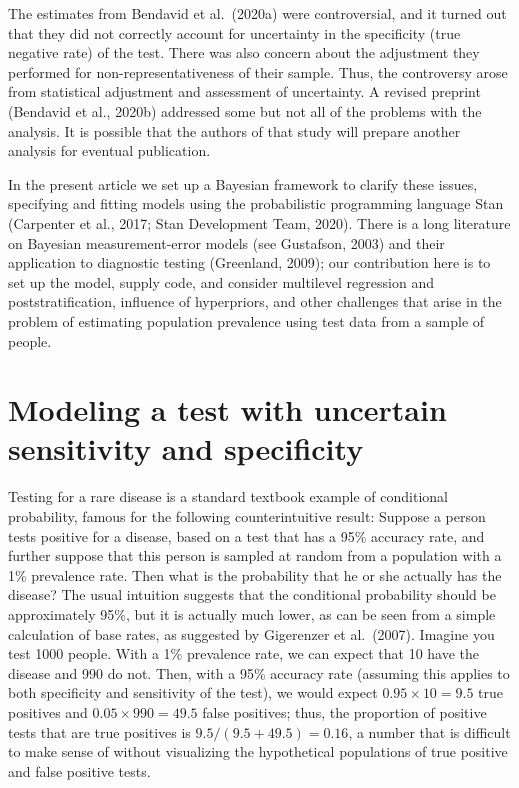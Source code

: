 \documentclass[11pt]{article}
\begin{document}
The estimates from Bendavid et al.\ (2020a) were controversial, and it turned out that they did not correctly account for uncertainty in the specificity (true negative rate) of the test.  There was also concern about the adjustment they performed for non-representativeness of their sample.  Thus, the controversy arose from statistical adjustment and assessment of uncertainty.  A revised preprint (Bendavid et al., 2020b) addressed some but not all of the problems with the analysis.  It is possible that the authors of that study will prepare another analysis for eventual publication.

In the present article we set up a Bayesian framework to clarify these issues, specifying and fitting models using the probabilistic programming language Stan (Carpenter et al., 2017; Stan Development Team, 2020).  There is a long literature on Bayesian measurement-error models (see Gustafson, 2003) and their application to diagnostic testing (Greenland, 2009); our contribution here is to set up the model, supply code, and consider multilevel regression and poststratification, influence of hyperpriors, and other challenges that arise in the problem of estimating population prevalence using test data from a sample of people.


\section{Modeling a test with uncertain sensitivity and specificity}\label{model1}

Testing for a rare disease is a standard textbook example of conditional probability, famous for the following counterintuitive result:  Suppose a person tests positive for a disease, based on a test that has a 95\% accuracy rate, and further suppose that this person is sampled at random from a population with a 1\% prevalence rate.  Then what is the probability that he or she actually has the disease? The usual intuition suggests that the conditional probability should be approximately 95\%, but it is actually much lower, as can be seen from a simple calculation of base rates, as suggested by Gigerenzer et al.\ (2007).  Imagine you test 1000 people.  With a 1\% prevalence rate, we can expect that 10 have the disease and 990 do not.  Then, with a 95\% accuracy rate (assuming this applies to both specificity and sensitivity of the test), we would expect $0.95 \times 10=9.5$ true positives and $0.05 \times 990 =  49.5$ false positives; thus, the proportion of positive tests that are true positives is $9.5/(9.5+49.5) = 0.16$, a number that is difficult to make sense of without visualizing the hypothetical populations of true positive and false positive tests.
\end{document}
